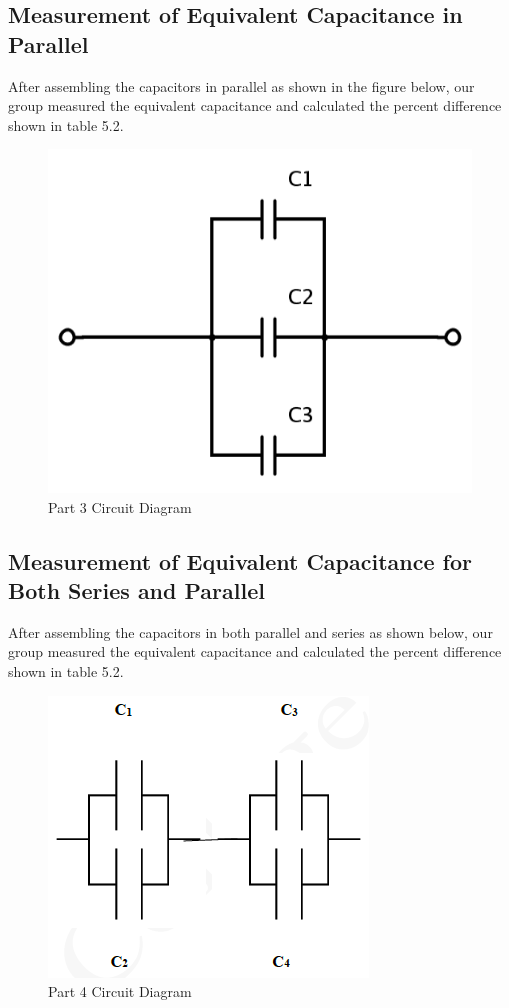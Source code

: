 \documentclass[titlepage]{article}
\begin{document}
        \subsection{Measurement of Equivalent Capacitance in Parallel}
        After assembling the capacitors in parallel as shown in the figure below, our group measured the equivalent capacitance and calculated the percent difference shown in table 5.2.

        \begin{figure}[hbt!] 
            \centering
            \caption*{Part 3 Circuit Diagram}
            \includegraphics[scale=0.5]{images/procedure/part3.png}
        \end{figure} 



        \FloatBarrier
        \subsection{Measurement of Equivalent Capacitance for Both Series and Parallel}
        After assembling the capacitors in both parallel and series as shown below, our group measured the equivalent capacitance and calculated the percent difference shown in table 5.2.

        \begin{figure}[hbt!] 
            \centering
            \caption*{Part 4 Circuit Diagram}
            \includegraphics[scale=0.7]{images/procedure/part4.png}
        \end{figure} 
\end{document}

